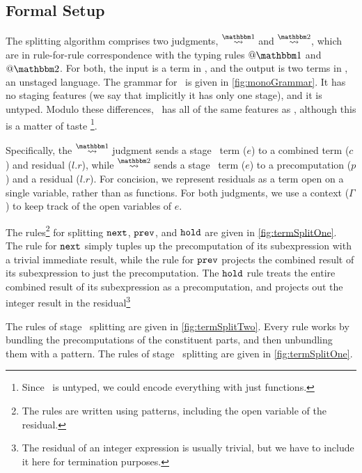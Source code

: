 \subsection {Formal Setup}

The splitting algorithm comprises two judgments, $\splitonesym$ and $\splittwosym$,
which are in rule-for-rule correspondence with the typing rules $@\bbone$ and $@\bbtwo$.
For both, the input is a term in \lang, and the output is two terms in \langmono, an
unstaged language.  The grammar for \langmono\ is given in \ref{fig:monoGrammar}.  It has no
staging features (we say that implicitly it has only one stage), and it is untyped.  
Modulo these differences, \langmono\ has all of the same features as \lang, 
although this is a matter of taste
\footnote{Since \langmono\ is untyped, we could encode everything with just functions.}.

Specifically, the $\splitonesym$ judgment sends a stage \bbone\ term ($e$) to a combined term ($c$) and residual ($l.r$),
while $\splittwosym$ sends a stage \bbtwo\ term ($e$) to a precomputation ($p$) and a residual ($l.r$).
For concision, we represent residuals as a term open on a single variable, rather than as functions.
For both judgments, we use a context ($\Gamma$) to keep track of the
open variables of $e$.



The rules\footnote{The rules are written using patterns, including the open variable of the residual.} 
for splitting ${\tt next}$, ${\tt prev}$, and ${\tt hold}$ are given in \ref{fig:termSplitOne}.
The rule for ${\tt next}$ simply tuples up the precomputation of its subexpression with a trivial immediate result,
while the rule for ${\tt prev}$ projects the combined result of its subexpression to just the precomputation.
The ${\tt hold}$ rule treats the entire combined result of its subexpression as a precomputation, 
and projects out the integer result in the residual\footnote{The residual of an integer expression is usually trivial, 
but we have to include it here for termination purposes.}

The rules of stage \bbtwo\ splitting are given in \ref{fig:termSplitTwo}.  
Every rule works by bundling the precomputations of the constituent parts, and then unbundling them with a pattern.
The rules of stage \bbone\ splitting are given in \ref{fig:termSplitOne}.  

